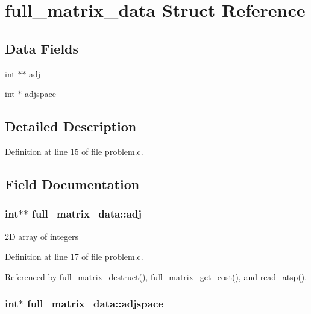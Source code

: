 \hypertarget{structfull__matrix__data}{
\section{full\_\-matrix\_\-data Struct Reference}
\label{structfull__matrix__data}
}
\subsection*{Data Fields}
\begin{CompactItemize}
\item 
int $\ast$$\ast$ \hyperlink{structfull__matrix__data_52eb922d8bc3eaacda3456933e130440}{adj}
\item 
int $\ast$ \hyperlink{structfull__matrix__data_ea7894cbcda81788ba158712027fb8c5}{adjspace}
\end{CompactItemize}


\subsection{Detailed Description}


Definition at line 15 of file problem.c.

\subsection{Field Documentation}
\hypertarget{structfull__matrix__data_52eb922d8bc3eaacda3456933e130440}{
\subsubsection{\setlength{\rightskip}{0pt plus 5cm}int$\ast$$\ast$ {\bf full\_\-matrix\_\-data::adj}}}
\label{structfull__matrix__data_52eb922d8bc3eaacda3456933e130440}


2D array of integers 

Definition at line 17 of file problem.c.

Referenced by full\_\-matrix\_\-destruct(), full\_\-matrix\_\-get\_\-cost(), and read\_\-atsp().\hypertarget{structfull__matrix__data_ea7894cbcda81788ba158712027fb8c5}{
\subsubsection{\setlength{\rightskip}{0pt plus 5cm}int$\ast$ {\bf full\_\-matrix\_\-data::adjspace}}}
\label{structfull__matrix__data_ea7894cbcda81788ba158712027fb8c5}


